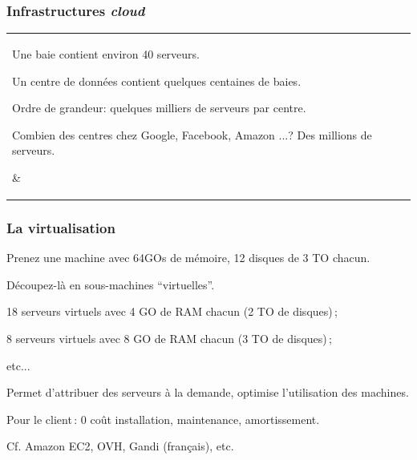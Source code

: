 \begin{frame}
\frametitle{Infrastructures \textit{cloud}}



\begin{tabular}{l|p{6cm}}
   \parbox{5cm}{

Une baie contient environ 40 serveurs.

\smallskip

Un centre de données contient quelques centaines de baies.

\smallskip

Ordre de grandeur: quelques milliers de serveurs par centre.

\smallskip

Combien des centres chez Google, Facebook, Amazon ...? Des millions
de serveurs.


   }  %
  & 
  \parbox{6cm}{ }
\end{tabular}
\vfill

\end{frame}


\begin{frame}
\frametitle{La virtualisation}

Prenez une machine avec 64GOs de mémoire, 12 disques de 3 TO chacun.

\medskip

Découpez-là en sous-machines ``virtuelles''.

\begin{redbullet}
  \item 18 serveurs virtuels avec 4 GO de RAM chacun (2 TO de disques)\,;
  \item 8 serveurs virtuels avec 8 GO de RAM chacun (3 TO de disques)\,;

    \item etc...
\end{redbullet}

Permet d'attribuer des serveurs à la demande, optimise l'utilisation des machines.

\medskip

Pour le client\,: 0 coût installation, maintenance, amortissement.

\medskip

Cf. Amazon EC2, OVH, Gandi (français), etc.

\end{frame}


